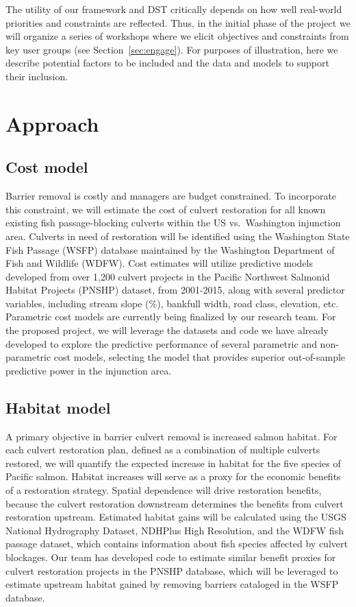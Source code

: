 \documentclass[12pt]{elsarticle}
\begin{document}
The utility of our framework and DST critically depends on how well real-world priorities and constraints are reflected. Thus, in the initial phase of the project we will organize a series of workshops where we elicit objectives and constraints from key user groups (see Section~\ref{sec:engage}). For purposes of illustration, here we describe potential factors to be included and the data and models to support their inclusion.   
%
\section{Approach}
\subsection{Cost model}

Barrier removal is costly and managers are budget constrained. To incorporate this constraint, we will estimate the cost of culvert restoration for all known existing fish passage-blocking culverts within the US vs.\ Washington injunction area. Culverts in need of restoration will be identified using the Washington State Fish Passage (WSFP) database maintained by the Washington Department of Fish and Wildlife (WDFW). Cost estimates will utilize predictive models developed from over 1,200 culvert projects in the Pacific Northwest Salmonid Habitat Projects (PNSHP) dataset, from 2001-2015, along with several predictor variables, including stream slope (\%), bankfull width, road class, elevation, etc. Parametric cost models are currently being finalized by our research team. For the proposed project, we will leverage the datasets and code we have already developed to explore the predictive performance of several parametric and non-parametric cost models, selecting the model that provides superior out-of-sample predictive power in the injunction area.


\subsection{Habitat model}

A primary objective in barrier culvert removal is increased salmon habitat. For each culvert restoration plan, defined as a combination of multiple culverts restored, we will quantify the expected increase in habitat for the five species of Pacific salmon. Habitat increases will serve as a proxy for the economic benefits of a restoration strategy. Spatial dependence will drive restoration benefits, because the culvert restoration downstream determines the benefits from culvert restoration upstream. Estimated habitat gains will be calculated using the USGS National Hydrography Dataset, NDHPlus High Resolution, and the WDFW fish passage dataset, which contains information about fish species affected by culvert blockages.  Our team has developed code to estimate similar benefit proxies for culvert restoration projects in the PNSHP database, which will be leveraged to estimate upstream habitat gained by removing barriers cataloged in the WSFP database. 
\end{document}
